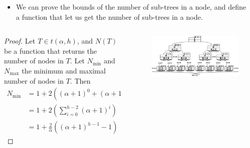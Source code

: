 \documentclass{beamer}
\begin{document}
\begin{frame}
    \begin{columns}
        \begin{column}{\textlecolumn}
            \begin{block}{}
                \vspace{-0.5cm}
                \begin{itemize}
                    \item We can prove the bounds of the number of sub-trees in a node, and define a function that let us get the number of sub-trees in a node.
                \end{itemize}
            \end{block}
        \end{column}
        \begin{column}{\textricolumn}
        \end{column}
    \end{columns}
    \begin{columns}
        \begin{column}{0.45\textwidth}
            \begin{block}{}
                \begin{proof}\renewcommand{\qedsymbol}{}
                    Let \(T \in t\left(\alpha, h\right)\), and \(N(T)\) be a function that returns the number of nodes in \(T\).
                    Let \(N_{\text{min}}\) and \(N_{\text{max}}\) the minimum and maximal number of nodes in \(T\). Then
                    \[
                        \begin{aligned}
                            N_{\text{min}} &= 1 + 2\left(\left(\alpha + 1\right)^0 + \left(\alpha + 1\right)^1 + \cdots + \left(\alpha + 1\right)^{h-2} \right) \\
                            & = 1 + 2\left(\sum^{h - 2}_{i = 0} \left(\alpha + 1\right)^i \right) \\
                            & = 1 + \frac{2}{\alpha}\left(\left(\alpha + 1\right)^{h - 1} - 1\right)
                        \end{aligned}
                    \]
                \end{proof}
            \end{block}
        \end{column}
        \begin{column}{0.6\textwidth}
            \begin{figure}
                \includegraphics[width=\linewidth,keepaspectratio]{resources/made/generic_min_btree.eps}

\end{figure}
\end{column}
\end{columns}
\end{frame}
\end{document}
